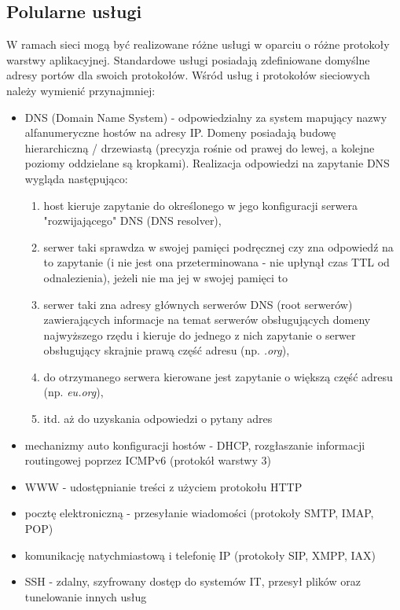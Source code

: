 \documentclass{pdfBooklets}
\begin{document}
\subsection{Polularne usługi}
W ramach sieci mogą być realizowane różne usługi w oparciu o różne protokoły warstwy aplikacyjnej. Standardowe usługi posiadają zdefiniowane domyślne adresy portów dla swoich protokołów. Wśród usług i protokołów sieciowych należy wymienić przynajmniej:
\begin{itemize}
	\item DNS (Domain Name System) - odpowiedzialny za system mapujący nazwy alfanumeryczne hostów na adresy IP.
		Domeny posiadają budowę hierarchiczną / drzewiastą (precyzja rośnie od prawej do lewej, a kolejne poziomy oddzielane są kropkami).
		Realizacja odpowiedzi na zapytanie DNS wygląda następująco:
		\begin{enumerate}
			\item host kieruje zapytanie do określonego w jego konfiguracji serwera "rozwijającego" DNS (DNS resolver),
			\item serwer taki sprawdza w swojej pamięci podręcznej czy zna odpowiedź na to zapytanie (i nie jest ona przeterminowana - nie upłynął czas TTL od odnalezienia), jeżeli nie ma jej w swojej pamięci to
			\item serwer taki zna adresy głównych serwerów DNS (root serwerów) zawierających informacje na temat serwerów obsługujących domeny najwyższego rzędu i kieruje do jednego z nich zapytanie o serwer obsługujący skrajnie prawą część adresu (np. \textit{.org}),
			\item do otrzymanego serwera kierowane jest zapytanie o większą część adresu (np. \textit{eu.org}),
			\item itd. aż do uzyskania odpowiedzi o pytany adres
		\end{enumerate}
	\item mechanizmy auto konfiguracji hostów - DHCP, rozgłaszanie informacji routingowej poprzez ICMPv6 (protokół warstwy 3)
	\item WWW - udostępnianie treści z użyciem protokołu HTTP
	\item pocztę elektroniczną - przesyłanie wiadomości (protokoły SMTP, IMAP, POP)
	\item komunikację natychmiastową i telefonię IP (protokoły SIP, XMPP, IAX)
	\item SSH - zdalny, szyfrowany dostęp do systemów IT, przesył plików oraz tunelowanie innych usług
\end{itemize}
\end{document}
